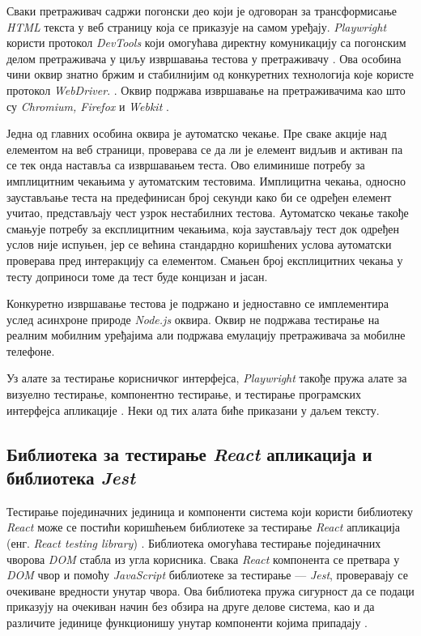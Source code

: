 \documentclass[12pt,oneside]{memoir}
\begin{document}
Сваки претраживач садржи погонски део који је одговоран за трансформисање \textit{HTML} текста у веб страницу која се приказује на самом уређају. \textit{Playwright} користи протокол \textit{DevTools} који омогућава директну комуникацију са погонским делом претраживача у циљу извршавања тестова у претраживачу \cite{playwrightTutorial}. Ова особина чини оквир знатно бржим и стабилнијим од конкуретних технологија које користе протокол \textit{WebDriver}. \cite{playwrightVsSelenium,speedTest}. Оквир подржава извршавање на претраживачима као што су \textit{Chromium,  Firefox} и \textit{Webkit} \cite{playwright, chromium,webKit}.

Једна од главних особина оквира је аутоматско чекање. Пре сваке акције над елементом на веб страници, проверава се да ли је елемент видљив и активан па се тек онда наставља са извршавањем теста. Ово елиминише потребу за имплицитним чекањима у аутоматским тестовима. Имплицитна чекања, односно заустављање теста на предефинисан број секунди како би се одређен елемент учитао, представљају чест узрок нестабилних тестова. Аутоматско чекање такође смањује потребу за експлицитним чекањима, која заустављају тест док одређен услов није испуњен, јер се већина стандардно коришћених услова аутоматски проверава пред интеракцију са елементом. Смањен број експлицитних чекања у тесту доприноси томе да тест буде концизан и јасан.

Конкуретно извршавање тестова је подржано и једноставно се имплементира услед асинхроне природе \textit{Node.js} оквира. Оквир не подржава тестирање на реалним мобилним уређајима али подржава емулацију претраживача за мобилне телефоне.

Уз алате за тестирање корисничког интерфејса, \textit{Playwright} такође пружа алате за визуелно тестирање, компонентно тестирање, и тестирање програмских интерфејса апликације \cite{playwright}. Неки од тих алата биће приказани у даљем тексту.

\subsection{Библиотека за тестирање \textit{React} апликација и  библиотека \textit{Jest}}

Тестирање појединачних јединица и компоненти система који користи библиотеку \textit{React} може се постићи коришћењем библиотеке за тестирање \textit{React} апликација (енг.\textit{ React testing library}) \cite{rtl}. Библиотека омогућава тестирање појединачних чворова \textit{DOM} стабла из угла корисника. Свака \textit{React} компонента се претвара у \textit{DOM} чвор и помоћу \textit{JavaScript} библиотеке за тестирање --- \textit{Jest}, проверавају се очекиване вредности унутар чвора. Ова библиотека пружа сигурност да се подаци приказују на очекиван начин без обзира на друге делове система, као и да различите јединице функционишу унутар компоненти којима припадају \cite{rtl,jest}.
\end{document}
